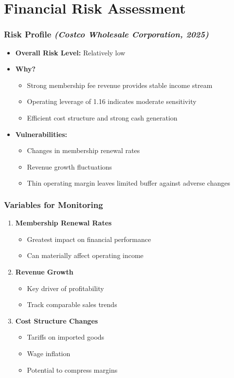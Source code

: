 \documentclass[11pt]{beamer}
\begin{document}
\section{Financial Risk Assessment}
\begin{frame}
\frametitle{Risk Profile \textit{(Costco Wholesale Corporation, 2025)}}
\begin{itemize}
  \item \textbf{Overall Risk Level:} Relatively low
  \item \textbf{Why?}
    \begin{itemize}
      \item Strong membership fee revenue provides stable income stream
      \item Operating leverage of 1.16 indicates moderate sensitivity
      \item Efficient cost structure and strong cash generation
    \end{itemize}
  \item \textbf{Vulnerabilities:}
    \begin{itemize}
      \item Changes in membership renewal rates
      \item Revenue growth fluctuations
      \item Thin operating margin leaves limited buffer against adverse changes
    \end{itemize}
\end{itemize}
\end{frame}

\begin{frame}
\frametitle{Variables for Monitoring}
\begin{enumerate}
  \item \textbf{Membership Renewal Rates}
    \begin{itemize}
      \item Greatest impact on financial performance
      \item Can materially affect operating income
    \end{itemize}
  \item \textbf{Revenue Growth}
    \begin{itemize}
      \item Key driver of profitability
      \item Track comparable sales trends
    \end{itemize}
  \item \textbf{Cost Structure Changes}
    \begin{itemize}
      \item Tariffs on imported goods
      \item Wage inflation
      \item Potential to compress margins
    \end{itemize}
\end{enumerate}
\end{frame}
\end{document}
